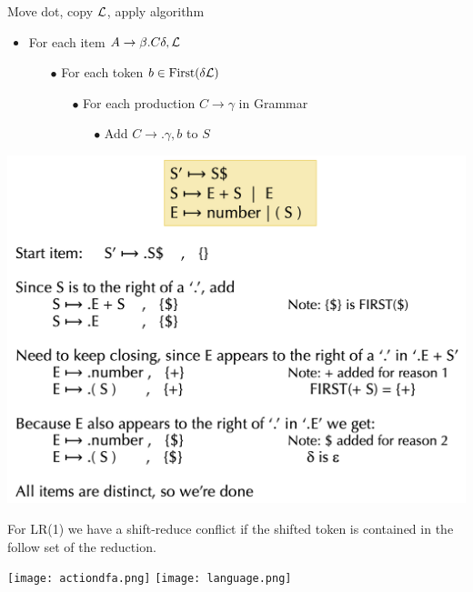 \begin{algorithm} Move dot, copy $\mathcal{L}$, apply algorithm
   \begin{itemize}
       \item For each item $A \to \beta . C \delta, \mathcal{L}$
        \begin{itemize}
            \item[$\bullet$] For each token $b \in \operatorname{First}(\delta \mathcal{L})$
            \begin{itemize}
                \item[$\bullet$] For each production $C \to \gamma$ in Grammar
                \begin{itemize}
                    \item[$\bullet$] Add $C \to .\gamma, b$ to $S$
                \end{itemize}
            \end{itemize}
        \end{itemize}
   \end{itemize}
\end{algorithm}

\vspace{-15pt}
\begin{center}
	\includegraphics[width=0.9\linewidth]{assets/lr1.png}
\end{center}
\vspace{-10pt}
For LR(1) we have a shift-reduce conflict if the shifted token is contained in the follow set of the reduction.

\begin{multicols*}{2}
	\texttt{[image: actiondfa.png]}
	\texttt{[image: language.png]}
\end{multicols*}
